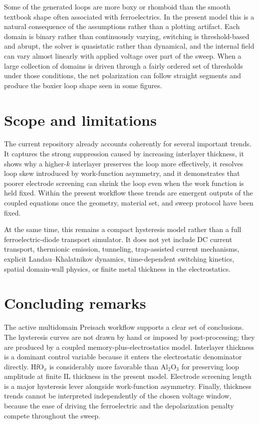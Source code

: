\documentclass[11pt]{article}
\begin{document}
Some of the generated loops are more boxy or rhomboid than the smooth textbook
shape often associated with ferroelectrics. In the present model this is a
natural consequence of the assumptions rather than a plotting artifact. Each
domain is binary rather than continuously varying, switching is threshold-based
and abrupt, the solver is quasistatic rather than dynamical, and the internal
field can vary almost linearly with applied voltage over part of the sweep.
When a large collection of domains is driven through a fairly ordered set of
thresholds under those conditions, the net polarization can follow straight
segments and produce the boxier loop shape seen in some figures.

\section{Scope and limitations}

The current repository already accounts coherently for several important trends.
It captures the strong suppression caused by increasing interlayer thickness, it
shows why a higher-$k$ interlayer preserves the loop more effectively, it
resolves loop skew introduced by work-function asymmetry, and it demonstrates
that poorer electrode screening can shrink the loop even when the work function
is held fixed. Within the present workflow these trends are emergent outputs of
the coupled equations once the geometry, material set, and sweep protocol have
been fixed.

At the same time, this remains a compact hysteresis model rather than a full
ferroelectric-diode transport simulator. It does not yet include DC current
transport, thermionic emission, tunneling, trap-assisted current mechanisms,
explicit Landau--Khalatnikov dynamics, time-dependent switching kinetics,
spatial domain-wall physics, or finite metal thickness in the electrostatics.

\section{Concluding remarks}

The active multidomain Preisach workflow supports a clear set of conclusions.
The hysteresis curves are not drawn by hand or imposed by post-processing; they
are produced by a coupled memory-plus-electrostatics model. Interlayer
thickness is a dominant control variable because it enters the electrostatic
denominator directly. HfO$_x$ is considerably more favorable than Al$_2$O$_3$
for preserving loop amplitude at finite IL thickness in the present model.
Electrode screening length is a major hysteresis lever alongside work-function
asymmetry. Finally, thickness trends cannot be interpreted independently of the
chosen voltage window, because the ease of driving the ferroelectric and the
depolarization penalty compete throughout the sweep.
\end{document}
